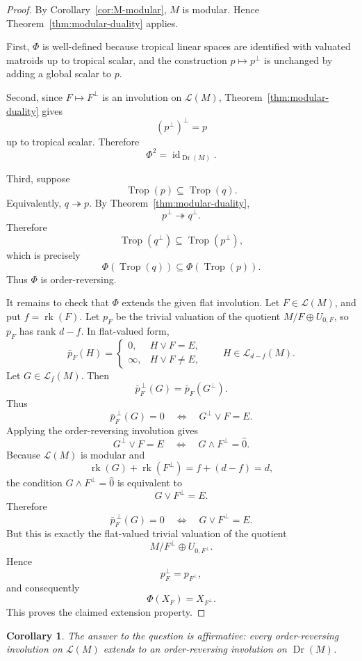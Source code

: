 \documentclass[12pt]{article}
\newcommand{\Trop}{\operatorname{Trop}}
\newcommand{\Dr}{\operatorname{Dr}}
\newcommand{\rk}{\operatorname{rk}}
\newcommand{\cL}{\mathcal L}
\theoremstyle{plain}
\newtheorem{corollary}[theorem]{Corollary}
\theoremstyle{definition}
\begin{document}
\begin{proof}
By Corollary~\ref{cor:M-modular}, \(M\) is modular.  Hence Theorem~\ref{thm:modular-duality} applies.

First, \(\Phi\) is well-defined because tropical linear spaces are identified with valuated matroids up to tropical scalar, and the construction \(p\mapsto p^\perp\) is unchanged by adding a global scalar to \(p\).

Second, since \(F\mapsto F^\perp\) is an involution on \(\cL(M)\), Theorem~\ref{thm:modular-duality} gives
\[
   (p^\perp)^\perp=p
\]
up to tropical scalar.  Therefore
\[
   \Phi^2=\operatorname{id}_{\Dr(M)}.
\]

Third, suppose
\[
   \Trop(p)\subseteq \Trop(q).
\]
Equivalently, \(q\twoheadrightarrow p\).  By Theorem~\ref{thm:modular-duality},
\[
   p^\perp\twoheadrightarrow q^\perp.
\]
Therefore
\[
   \Trop(q^\perp)\subseteq \Trop(p^\perp),
\]
which is precisely
\[
   \Phi(\Trop(q))\subseteq \Phi(\Trop(p)).
\]
Thus \(\Phi\) is order-reversing.

It remains to check that \(\Phi\) extends the given flat involution.  Let \(F\in\cL(M)\), and put \(f=\rk(F)\).  Let \(p_F\) be the trivial valuation of the quotient \(M/F\oplus U_{0,F}\), so \(p_F\) has rank \(d-f\).  In flat-valued form,
\[
   \bar p_F(H)=
   \begin{cases}
   0, & H\vee F=E,\\
   \infty, & H\vee F\ne E,
   \end{cases}
   \qquad H\in \cL_{d-f}(M).
\]
Let \(G\in\cL_f(M)\).  Then
\[
   \bar p_F^{\,\perp}(G)
   =
   \bar p_F(G^\perp).
\]
Thus
\[
   \bar p_F^{\,\perp}(G)=0
   \quad\Longleftrightarrow\quad
   G^\perp\vee F=E.
\]
Applying the order-reversing involution gives
\[
   G^\perp\vee F=E
   \quad\Longleftrightarrow\quad
   G\wedge F^\perp=\hat 0.
\]
Because \(\cL(M)\) is modular and
\[
   \rk(G)+\rk(F^\perp)=f+(d-f)=d,
\]
the condition \(G\wedge F^\perp=\hat 0\) is equivalent to
\[
   G\vee F^\perp=E.
\]
Therefore
\[
   \bar p_F^{\,\perp}(G)=0
   \quad\Longleftrightarrow\quad
   G\vee F^\perp=E.
\]
But this is exactly the flat-valued trivial valuation of the quotient
\[
   M/F^\perp\oplus U_{0,F^\perp}.
\]
Hence
\[
   p_F^\perp=p_{F^\perp},
\]
and consequently
\[
   \Phi(X_F)=X_{F^\perp}.
\]
This proves the claimed extension property.
\end{proof}

\begin{corollary}
The answer to the question is affirmative: every order-reversing involution on \(\cL(M)\) extends to an order-reversing involution on \(\Dr(M)\).
\end{corollary}
\end{document}
